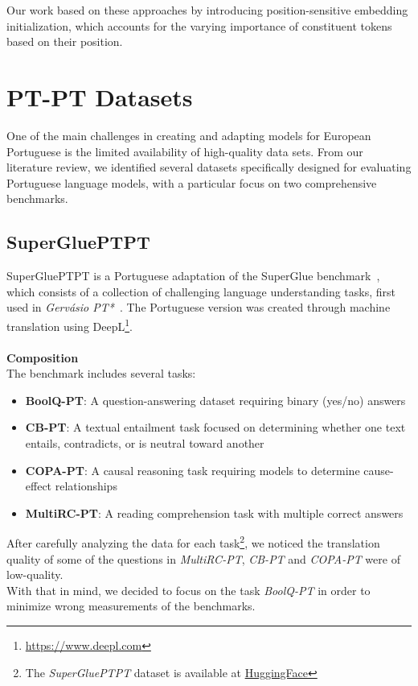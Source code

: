 Our work based on these approaches by introducing position-sensitive embedding initialization, which accounts for the varying importance of constituent tokens based on their position.

\section{PT-PT Datasets}\label{Section3.3}
One of the main challenges in creating and adapting models for European Portuguese is the limited availability of high-quality data sets. From our literature review, we identified several datasets specifically designed for evaluating Portuguese language models, with a particular focus on two comprehensive benchmarks.

\subsection{SuperGluePTPT}\label{Section3.3.1}\label{subsec:dataset-superglueptpt}
SuperGluePTPT is a Portuguese adaptation of the SuperGlue benchmark~\cite{wang2019superglue}, which consists of a collection of challenging language understanding tasks, first used in \textit{Gervásio PT*}~\cite{Gervasio}. The Portuguese version was created through machine translation using DeepL\footnote[1]{\url{https://www.deepl.com}}.\\
\\
\textbf{Composition}\\
The benchmark includes several tasks:
\begin{itemize}
    \item \textbf{BoolQ-PT}: A question-answering dataset requiring binary (yes/no) answers
    \item \textbf{CB-PT}: A textual entailment task focused on determining whether one text entails, contradicts, or is neutral toward another
    \item \textbf{COPA-PT}: A causal reasoning task requiring models to determine cause-effect relationships
    \item \textbf{MultiRC-PT}: A reading comprehension task with multiple correct answers
\end{itemize}

After carefully analyzing the data for each task\footnote{The \textit{SuperGluePTPT} dataset is available at \href{https://huggingface.co/datasets/PORTULAN/extraglue}{HuggingFace}}, we noticed the translation quality of some of the questions in \textit{MultiRC-PT}, \textit{CB-PT} and \textit{COPA-PT} were of low-quality.\\
With that in mind, we decided to focus on the task \textit{BoolQ-PT} in order to minimize wrong measurements of the benchmarks.

